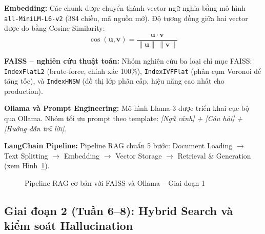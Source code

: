 \documentclass[10pt, conference, a4paper, compsocconf]{IEEEtran}
\begin{document}
\textbf{Embedding:} Các chunk được chuyển thành vector ngữ nghĩa bằng mô
hình \texttt{all-MiniLM-L6-v2} (384 chiều, mã nguồn mở). Độ tương đồng
giữa hai vector được đo bằng Cosine Similarity:
\begin{equation}
  \cos(\mathbf{u},\mathbf{v}) = \frac{\mathbf{u}\cdot\mathbf{v}}
    {\|\mathbf{u}\|\,\|\mathbf{v}\|}
\end{equation}

\textbf{FAISS -- nghiên cứu thuật toán:} Nhóm nghiên cứu ba loại chỉ mục
FAISS: \texttt{IndexFlatL2} (brute-force, chính xác 100\%),
\texttt{IndexIVFFlat} (phân cụm Voronoi để tăng tốc), và
\texttt{IndexHNSW} (đồ thị lớp phân cấp, hiệu năng cao nhất cho production).

\textbf{Ollama và Prompt Engineering:} Mô hình Llama-3 được triển khai cục
bộ qua Ollama. Nhóm tối ưu prompt theo template:
\textit{[Ngữ cảnh] + [Câu hỏi] + [Hướng dẫn trả lời]}.

\textbf{LangChain Pipeline:} Pipeline RAG chuẩn 5 bước:
Document Loading $\to$ Text Splitting $\to$ Embedding $\to$ Vector Storage
$\to$ Retrieval \& Generation (xem Hình~\ref{fig:rag-basic}).

\begin{figure}[H]
\centering
{}
\caption{Pipeline RAG cơ bản với FAISS và Ollama -- Giai đoạn 1}
\label{fig:rag-basic}
\end{figure}

\subsection{Giai đoạn 2 (Tuần 6--8): Hybrid Search và kiểm soát Hallucination}
\end{document}
